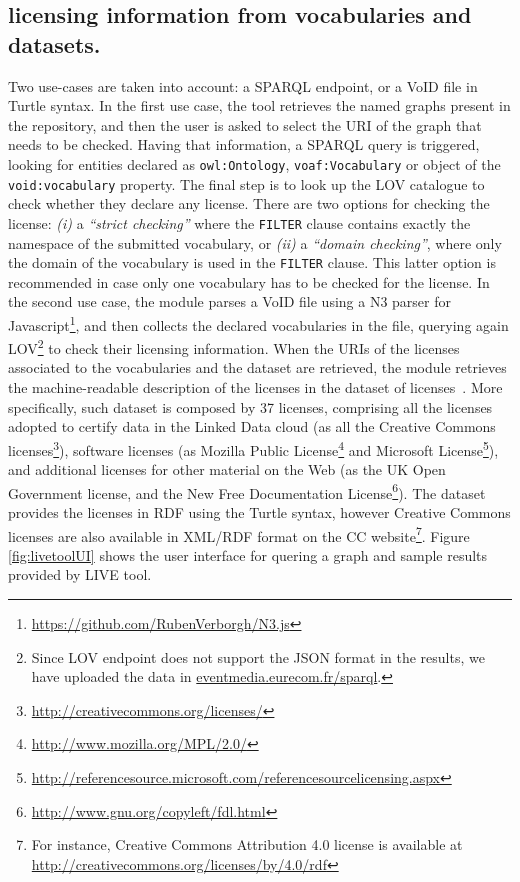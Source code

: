 \subsection{licensing information from vocabularies and datasets.}
Two use-cases are taken into account: a SPARQL endpoint, or a VoID file in Turtle syntax. 
In the first use case, the tool retrieves the named graphs present in the repository, and then the user is asked to select the URI of the graph that needs to be checked. Having that information, a SPARQL query is triggered, looking for entities declared as \texttt{owl:Ontology}, \texttt{voaf:Vocabulary} or object  of the \texttt{void:vocabulary} property. The final step is to look up the LOV catalogue to check whether they declare any license. There are two options for checking the license: \textit{(i)} a \textit{``strict checking'' } where the \texttt{FILTER} clause contains exactly the namespace of the submitted vocabulary, or \textit{(ii)} a \textit{``domain checking''}, where only the domain of the vocabulary is used in the \texttt{FILTER} clause. This latter option is recommended in case only one vocabulary has to be checked for the license. 
%
In the second use case, the module parses a VoID file using a N3 parser for Javascript\footnote{\url{https://github.com/RubenVerborgh/N3.js}}, and then collects the declared vocabularies in the file, querying again LOV\footnote{Since LOV endpoint does not support the JSON format in the results, we have uploaded the data in \url{eventmedia.eurecom.fr/sparql}.} to check their licensing information. 
%
When the URIs of the licenses associated to the vocabularies and the dataset are retrieved, the module retrieves the machine-readable description of the licenses in the dataset of licenses~\cite{CabrioESWC2014}. More specifically, such dataset is composed by 37 licenses, comprising all the licenses adopted to certify data in the Linked Data cloud (as all the Creative Commons licenses\footnote{\url{http://creativecommons.org/licenses/}}), software licenses (as Mozilla Public License\footnote{\url{http://www.mozilla.org/MPL/2.0/}} and Microsoft License\footnote{\url{http://referencesource.microsoft.com/referencesourcelicensing.aspx}}), and additional licenses for other material on the Web (as the UK Open Government license, and the New Free Documentation License\footnote{\url{http://www.gnu.org/copyleft/fdl.html}}). The dataset provides the licenses in RDF using the Turtle syntax, however Creative Commons licenses are also available in XML/RDF format on the CC website\footnote{For instance, Creative Commons Attribution 4.0 license is available at \url{http://creativecommons.org/licenses/by/4.0/rdf}}.
Figure \ref{fig:livetoolUI} shows the user interface for quering a graph and sample results provided by LIVE tool.  

